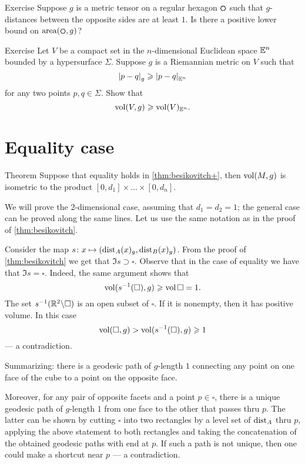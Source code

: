 \begin{thm}{Exercise}\label{ex:hexagon}
Suppose $g$ is a metric tensor on a regular hexagon $\textbf{\hexagon}$ such that $g$-distances between the opposite sides are at least $1$.
Is there a positive lower bound on $\area(\textbf{\hexagon},g)$?
\end{thm}



\begin{thm}{Exercise}\label{ex:gadograph}
Let $V$ be a compact set in the $n$-dimensional Euclidean space $\mathbb{E}^n$ bounded by a hypersurface $\Sigma$.
Suppose $g$ is a Riemannian metric on $V$ such that 
\[\dist{p}{q}{g}\ge\dist{p}{q}{\EE^n}\]
for any two points $p,q\in \Sigma$.
Show that
\[\operatorname{\rm vol}\nolimits(V,g)\geqslant \operatorname{\rm vol}\nolimits(V)_{\mathbb{E}^n}.\]
 
\end{thm}

\section{Equality case}

\begin{thm}{Theorem}\label{thm:besicovitch=}
Suppose that equality holds in \ref{thm:besikovitch+},
then $\operatorname{\rm vol}\nolimits(M,g)$ is isometric to the product $[0,d_1]\times\dots\times[0,d_n]$.
\end{thm}
 
We will prove the 2-dimensional case, assuming that $d_1=d_2=1$;
the general case can be proved along the same lines.
Let us use the same notation as in the proof of \ref{thm:besikovitch}.

Consider the map $s\colon x\mapsto(\mathrm{dist}_A(x)_g,\mathrm{dist}_B(x)_g)$.
From the proof of \ref{thm:besikovitch} we get that $\Im s\supset \square$.
Observe that in the case of equality we have that $\Im s= \square$.
Indeed,
the same argument shows that 
\[\operatorname{\rm vol}\nolimits(s^{-1}(\square),g)\geqslant \operatorname{\rm vol}\nolimits\square=1.\]
The set $s^{-1}(\mathbb{R}^2\backslash \square)$ is an open subset of $\square$.
If it is nonempty, then it has positive volume.
In this case
\[\operatorname{\rm vol}\nolimits(\square,g)>\operatorname{\rm vol}\nolimits(s^{-1}(\square),g)\geqslant 1\]
--- a contradiction.

Summarizing: there is a geodesic path of $g$-length $1$ connecting any point on one face of the cube to a point on the opposite face.

Moreover, for any pair of opposite facets and a point $p\in\square$, there is a unique geodesic path of $g$-length $1$ from one face to the other that passes thru $p$.
The latter can be shown by cutting $\square$ into two rectangles by a level set of $\mathrm{dist}_A$ thru $p$,
applying the above statement to both rectangles and taking the concatenation of the obtained geodesic paths with end at $p$.
If such a path is not unique, then one could make a shortcut near $p$ --- a contradiction.


